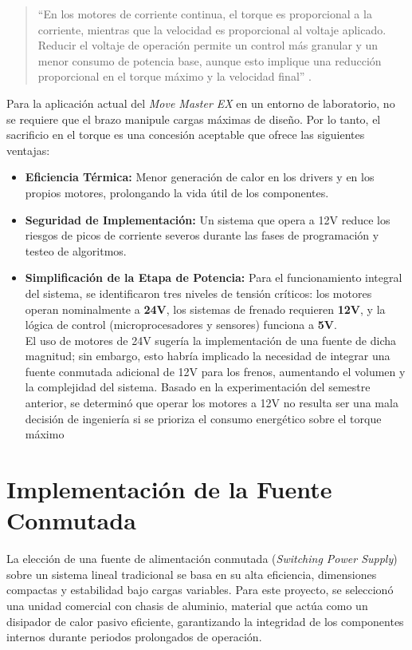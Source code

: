 \begin{quote}
	``En los motores de corriente continua, el torque es proporcional a la corriente, mientras que la velocidad es proporcional al voltaje aplicado. Reducir el voltaje de operación permite un control más granular y un menor consumo de potencia base, aunque esto implique una reducción proporcional en el torque máximo y la velocidad final'' \cite{Hughes}.
\end{quote}

Para la aplicación actual del \textit{Move Master EX} en un entorno de laboratorio, no se requiere que el brazo manipule cargas máximas de diseño. Por lo tanto, el sacrificio en el torque es una concesión aceptable que ofrece las siguientes ventajas:

\begin{itemize}
	\item \textbf{Eficiencia Térmica:} Menor generación de calor en los drivers y en los propios motores, prolongando la vida útil de los componentes.
	\item \textbf{Seguridad de Implementación:} Un sistema que opera a 12V reduce los riesgos de picos de corriente severos durante las fases de programación y testeo de algoritmos.
	\item \textbf{Simplificación de la Etapa de Potencia:}  Para el funcionamiento integral del sistema, se identificaron tres niveles de tensión críticos: los motores operan nominalmente a \textbf{24V}, los sistemas de frenado requieren \textbf{12V}, y la lógica de control (microprocesadores y sensores) funciona a \textbf{5V}. \\
	El uso de motores de 24V sugería la implementación de una fuente de dicha magnitud; sin embargo, esto habría implicado la necesidad de integrar una fuente conmutada adicional de 12V para los frenos, aumentando el volumen y la complejidad del sistema. Basado en la experimentación del semestre anterior, se determinó que operar los motores a 12V no resulta ser una mala decisión de ingeniería si se prioriza el consumo energético sobre el torque máximo
\end{itemize}



\section{Implementación de la Fuente Conmutada}
La elección de una fuente de alimentación conmutada (\textit{Switching Power Supply}) sobre un sistema lineal tradicional se basa en su alta eficiencia, dimensiones compactas y estabilidad bajo cargas variables. Para este proyecto, se seleccionó una unidad comercial con chasis de aluminio, material que actúa como un disipador de calor pasivo eficiente, garantizando la integridad de los componentes internos durante periodos prolongados de operación.

